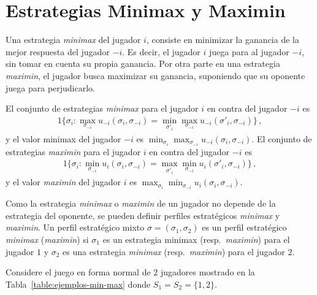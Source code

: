 \chapter{Estrategias Minimax y Maximin}
\label{apex:chapter:estrategias}

Una estrategia \textit{minimax} del jugador $i$, consiste en minimizar la ganancia de la mejor respuesta del jugador $-i$. Es decir, el jugador $i$ juega para  al jugador $-i$, sin tomar en cuenta su propia ganancia. Por otra parte en una estrategia \textit{maximin}, el jugador busca maximizar su ganancia, suponiendo que su oponente juega para perjudicarlo.

\begin{definition}
El conjunto de estrategias \textit{minimax} para el jugador $i$ en contra del jugador $-i$ es
\begin{alignat}{1}
\{ \sigma_i : \max_{\sigma_{-i}}u_{-i}(\sigma_i, \sigma_{-i}) = \min_{\sigma'_i}{\max_{\sigma_{-i}} u_{-i}(\sigma'_i, \sigma_{-i})} \}\,,
\end{alignat}
y el valor minimax del jugador $-i$ es $\min_{\sigma_i}{\max_{\sigma_{-i}}{u_{-i}(\sigma_i, \sigma_{-i})}}$.
El conjunto de estrategias \textit{maximin} para el jugador $i$ en contra del jugador $-i$ es
\begin{alignat}{1}
\{ \sigma_i : \min_{\sigma_{-i}}u_i(\sigma_i, \sigma_{-i}) = \max_{\sigma'_i}{\min_{\sigma_{-i}} u_i(\sigma'_i, \sigma_{-i})} \}\,,
\end{alignat}
y el valor \textit{maximin} del jugador $i$ es $\max_{\sigma_i}{\min_{\sigma_{-i}}{u_i(\sigma_i, \sigma_{-i})}}$.
\end{definition}

Como la estrategia \textit{minimax} o \textit{maximin} de un jugador no depende de la estrategia del oponente, se pueden definir perfiles estratégicos \textit{minimax} y \textit{maximin}. Un perfil estratégico mixto $\sigma = (\sigma_1, \sigma_2)$ es un perfil estratégico \textit{minimax} (\textit{maximin}) si $\sigma_1$ es un estrategia minimax (resp.\ \textit{maximin}) para el jugador $1$ y $\sigma_2$ es una estrategia \textit{minimax} (resp.\ \textit{maximin}) para el jugador $2$.

\begin{example}
\label{ex:ejemplos-min-max}
Considere el juego en forma normal de $2$ jugadores mostrado en la Tabla~\ref{table:ejemplos-min-max} donde $S_1 = S_2 = \{1, 2\}$.
\end{example}

